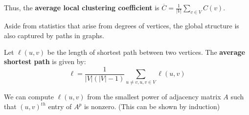 \documentclass{article}
\begin{document}
Thus, the \textbf{average local clustering coefficient} is $\overline{C}=\frac{1}{|V|}\sum_{v \in V} C(v)$.

Aside from statistics that arise from degrees of vertices, the global structure is also captured by paths in graphs. 

\begin{definition}
    Let $\ell(u,v)$ be the length of shortest path between two vertices. The \textbf{average shortest path} is given by:
    $$
    \ell = \frac{1}{|V|(|V|-1)} \sum_{u\neq v, u,v\in V} \ell (u,v)
    $$
\end{definition}

\begin{remark}
    We can compute $\ell(u,v)$ from the smallest power of adjacency matrix $A$ such that $(u,v)^{th}$ entry of $A^p$ is nonzero. (This can be shown by induction)
\end{remark}




\end{document}
